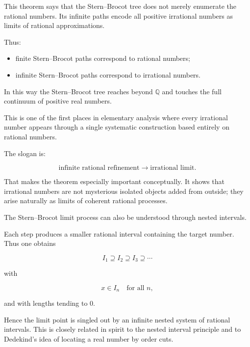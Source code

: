 \begin{remark}[Interpretation]
This theorem says that the Stern--Brocot tree does not merely enumerate
the rational numbers.  Its infinite paths encode all positive irrational
numbers as limits of rational approximations.

Thus:

\begin{itemize}
\item finite Stern--Brocot paths correspond to rational numbers;
\item infinite Stern--Brocot paths correspond to irrational numbers.
\end{itemize}

In this way the Stern--Brocot tree reaches beyond $\mathbb{Q}$ and
touches the full continuum of positive real numbers.
\end{remark}

\begin{remark}
This is one of the first places in elementary analysis where every
irrational number appears through a single systematic construction based
entirely on rational numbers.

The slogan is:

\[
\text{infinite rational refinement} \longrightarrow \text{irrational limit}.
\]

That makes the theorem especially important conceptually.  It shows that
irrational numbers are not mysterious isolated objects added from
outside; they arise naturally as limits of coherent rational processes.
\end{remark}


\begin{remark}
The Stern--Brocot limit process can also be understood through nested
intervals.

Each step produces a smaller rational interval containing the target
number.  Thus one obtains

\[
I_1 \supseteq I_2 \supseteq I_3 \supseteq \cdots
\]

with

\[
x \in I_n
\quad\text{for all }n,
\]

and with lengths tending to $0$.

Hence the limit point is singled out by an infinite nested system of
rational intervals.  This is closely related in spirit to the nested
interval principle and to Dedekind's idea of locating a real number by
order cuts.
\end{remark}


